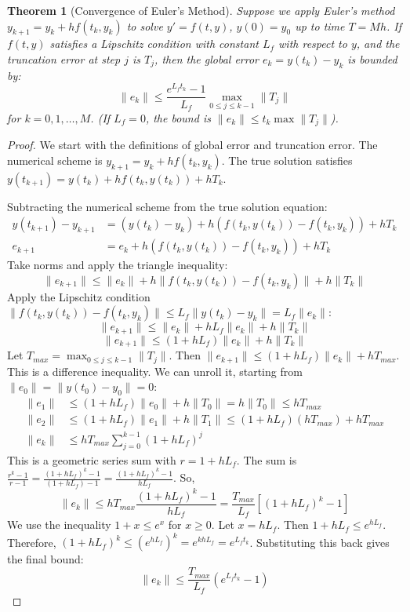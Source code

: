 \documentclass{article}
\newtheorem{theorem}{Theorem}
\begin{document}
\begin{theorem}[Convergence of Euler's Method]
Suppose we apply Euler's method $y_{k+1} = y_k + h f(t_k, y_k)$ to solve $y' = f(t, y)$, $y(0)=y_0$ up to time $T = M h$. If $f(t, y)$ satisfies a Lipschitz condition with constant $L_f$ with respect to $y$, and the truncation error at step $j$ is $T_j$, then the global error $e_k = y(t_k) - y_k$ is bounded by:
\[
\|e_k\| \le \frac{e^{L_f t_k} - 1}{L_f} \max_{0 \le j \le k-1} \|T_j\|
\]
for $k=0, 1, \dots, M$. (If $L_f=0$, the bound is $\|e_k\| \le t_k \max \|T_j\|$).
\end{theorem}

\begin{proof}
We start with the definitions of global error and truncation error.
The numerical scheme is $y_{k+1} = y_k + h f(t_k, y_k)$.
The true solution satisfies $y(t_{k+1}) = y(t_k) + h f(t_k, y(t_k)) + h T_k$.

Subtracting the numerical scheme from the true solution equation:
\begin{align*}
y(t_{k+1}) - y_{k+1} &= (y(t_k) - y_k) + h (f(t_k, y(t_k)) - f(t_k, y_k)) + h T_k \\
e_{k+1} &= e_k + h (f(t_k, y(t_k)) - f(t_k, y_k)) + h T_k
\end{align*}
Take norms and apply the triangle inequality:
\[
\|e_{k+1}\| \le \|e_k\| + h \|f(t_k, y(t_k)) - f(t_k, y_k)\| + h \|T_k\|
\]
Apply the Lipschitz condition $\|f(t_k, y(t_k)) - f(t_k, y_k)\| \le L_f \|y(t_k) - y_k\| = L_f \|e_k\|$:
\[
\|e_{k+1}\| \le \|e_k\| + h L_f \|e_k\| + h \|T_k\|
\]
\[
\|e_{k+1}\| \le (1 + h L_f) \|e_k\| + h \|T_k\|
\]
Let $T_{max} = \max_{0 \le j \le k-1} \|T_j\|$. Then $\|e_{k+1}\| \le (1 + h L_f) \|e_k\| + h T_{max}$.
This is a difference inequality. We can unroll it, starting from $\|e_0\| = \|y(t_0) - y_0\| = 0$:
\begin{align*}
\|e_1\| &\le (1 + h L_f) \|e_0\| + h \|T_0\| = h \|T_0\| \le h T_{max} \\
\|e_2\| &\le (1 + h L_f) \|e_1\| + h \|T_1\| \le (1 + h L_f) (h T_{max}) + h T_{max} \\
\|e_k\| &\le h T_{max} \sum_{j=0}^{k-1} (1 + h L_f)^j
\end{align*}
This is a geometric series sum with $r = 1 + h L_f$. The sum is $\frac{r^k - 1}{r-1} = \frac{(1 + h L_f)^k - 1}{(1 + h L_f) - 1} = \frac{(1 + h L_f)^k - 1}{h L_f}$.
So,
\[
\|e_k\| \le h T_{max} \frac{(1 + h L_f)^k - 1}{h L_f} = \frac{T_{max}}{L_f} [(1 + h L_f)^k - 1]
\]
We use the inequality $1+x \le e^x$ for $x \ge 0$. Let $x = h L_f$. Then $1 + h L_f \le e^{h L_f}$.
Therefore, $(1 + h L_f)^k \le (e^{h L_f})^k = e^{k h L_f} = e^{L_f t_k}$.
Substituting this back gives the final bound:
\[
\|e_k\| \le \frac{T_{max}}{L_f} (e^{L_f t_k} - 1)
\]
\end{proof}
\end{document}
